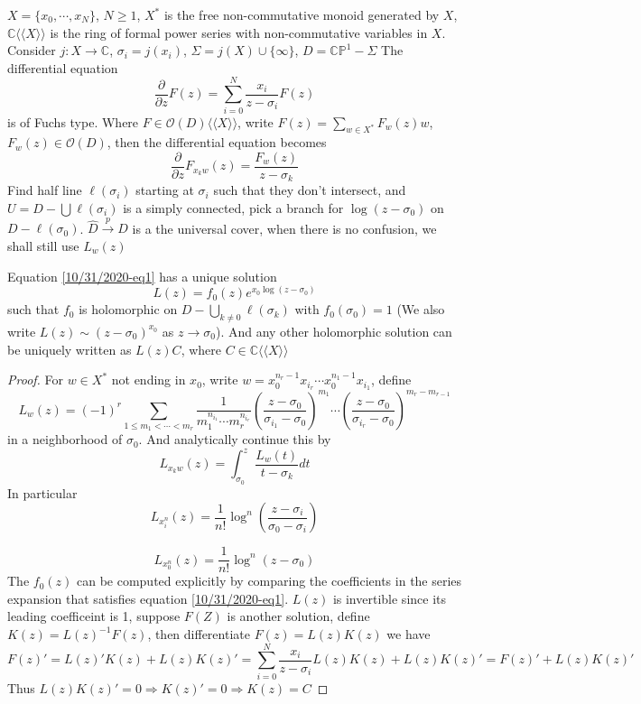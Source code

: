 \documentclass[main]{subfiles}
\begin{document}
$X=\{x_0,\cdots, x_N\}$, $N\geq1$, $X^*$ is the free non-commutative monoid generated by $X$, $\mathbb C\langle\langle X\rangle\rangle$ is the ring of formal power series with non-commutative variables in $X$. Consider $j:X\to\mathbb C$, $\sigma_i=j(x_i)$, $\Sigma=j(X)\cup\{\infty\}$, $D=\mathbb{CP}^1-\Sigma$
The differential equation
\begin{equation}\label{10/31/2020-eq1}
\frac{\partial}{\partial z}F(z)=\sum_{i=0}^N\frac{x_i}{z-\sigma_i}F(z)
\end{equation}
is of Fuchs type. Where $F\in\mathcal O(D)\langle\langle X\rangle\rangle$, write $F(z)=\sum_{w\in X^*}F_w(z)w$, $F_w(z)\in\mathcal O(D)$, then the differential equation becomes
\begin{equation}\label{10/31/2020-eq2}
\frac{\partial}{\partial z}F_{x_kw}(z)=\frac{F_w(z)}{z-\sigma_k}
\end{equation}
Find half line $\ell(\sigma_i)$ starting at $\sigma_i$ such that they don't intersect, and $U=D-\bigcup\ell(\sigma_i)$ is a simply connected, pick a branch for $\log(z-\sigma_0)$ on $D-\ell(\sigma_0)$. $\hat D\xrightarrow p D$ is a the universal cover, when there is no confusion, we shall still use $L_w(z)$

\begin{theorem}
Equation \eqref{10/31/2020-eq1} has a unique solution
\[L(z)=f_0(z)e^{x_0\log(z-\sigma_0)}\]
such that $f_0$ is holomorphic on $D-\bigcup_{k\neq0}\ell(\sigma_k)$ with $f_0(\sigma_0)=1$ (We also write $L(z)\sim (z-\sigma_0)^{x_0}$ as $z\to\sigma_0$). And any other holomorphic solution can be uniquely written as $L(z)C$, where $C\in\mathbb C\langle\langle X\rangle\rangle$
\end{theorem}

\begin{proof}
For $w\in X^*$ not ending in $x_0$, write $w=x_0^{n_r-1}x_{i_r}\cdots x_0^{n_1-1}x_{i_1}$, define
\[L_w(z)=(-1)^r\sum_{1\leq m_1<\cdots<m_r}\frac{1}{m_1^{n_{i_1}}\cdots m_r^{n_{i_r}}}\left(\frac{z-\sigma_0}{\sigma_{i_1}-\sigma_0}\right)^{m_1}\cdots\left(\frac{z-\sigma_0}{\sigma_{i_r}-\sigma_0}\right)^{m_r-m_{r-1}}\]
in a neighborhood of $\sigma_0$. And analytically continue this by
\[L_{x_kw}(z)=\int_{\sigma_0}^z\frac{L_w(t)}{t-\sigma_k}dt\]
In particular
\[L_{x_i^n}(z)=\frac{1}{n!}\log^{n}\left(\frac{z-\sigma_i}{\sigma_0-\sigma_i}\right)\]

\[L_{x_0^n}(z)=\frac{1}{n!}\log^{n}\left(z-\sigma_0\right)\]
The $f_0(z)$ can be computed explicitly by comparing the coefficients in the series expansion that satisfies equation \eqref{10/31/2020-eq1}. $L(z)$ is invertible since its leading coefficeint is 1, suppose $F(Z)$ is another solution, define $K(z)=L(z)^{-1}F(z)$, then differentiate $F(z)=L(z)K(z)$ we have
\[F(z)'=L(z)'K(z)+L(z)K(z)'=\sum_{i=0}^N\frac{x_i}{z-\sigma_i}L(z)K(z)+L(z)K(z)'=F(z)'+L(z)K(z)'\]
Thus $L(z)K(z)'=0\Rightarrow K(z)'=0\Rightarrow K(z)=C$
\end{proof}
\end{document}
